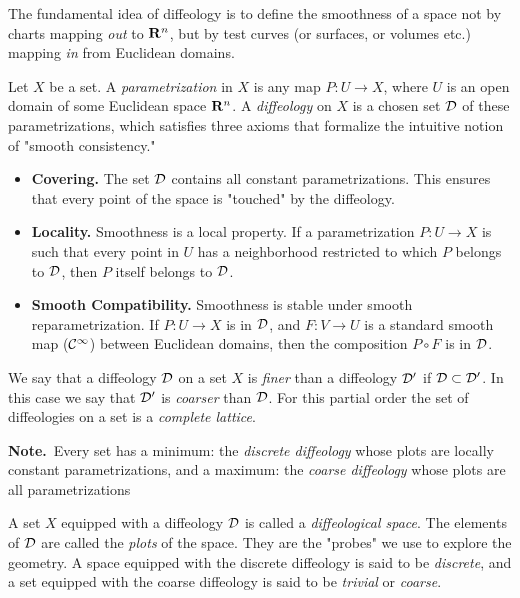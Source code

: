   The fundamental idea of diffeology is to define the smoothness of a space not by charts mapping \emph{out} to ${\mathbf{R}}^n$,
  but by test curves (or surfaces, or volumes etc.) mapping \emph{in} from Euclidean domains.
  
  Let $X$ be a set.
  A \emph{parametrization} in $X$ is any map $P: U \to X$,
  where $U$ is an open domain of some Euclidean space ${\mathbf{R}}^n$.
  A \emph{diffeology} on $X$ is a chosen set $\mathcal{D}$ of these parametrizations,
  which satisfies three axioms that formalize the intuitive notion of "smooth consistency."
  
  \begin{itemize}
    \item[D1.]\textbf{Covering.}
    The set $\mathcal{D}$ contains all constant parametrizations.
    This ensures that every point of the space is "touched" by the diffeology.
    \item[D2.] \textbf{Locality.}
    Smoothness is a local property.
    If a parametrization $P: U \to X$ is such that every point in $U$ has a neighborhood restricted to which $P$ belongs to $\mathcal{D}$,
    then $P$ itself belongs to $\mathcal{D}$.
    \item[D3.] \textbf{Smooth Compatibility.}
    Smoothness is stable under smooth re\-pa\-ra\-me\-tri\-za\-tion.
    If $P: U \to X$ is in $\mathcal{D}$,
    and $F: V \to U$ is a standard smooth map (${\mathcal{C}}^\infty$) between Euclidean domains,
    then the composition $P \circ F$ is in $\mathcal{D}$.
  \end{itemize}
  
  \begin{article}
    We say that a diffeology $\mathcal{D}$ on a set $X$ is \emph{finer} than a diffeology $\mathcal{D}'$ if $\mathcal{D} \subset \mathcal{D}'$.
    In this case we say that $\mathcal{D}'$ is \emph{coarser} than $\mathcal{D}$.
    For this partial order the set of diffeologies on a set is a \emph{complete lattice}.
    
    \textbf{Note.}~Every set has a minimum: the \emph{discrete diffeology} whose plots are locally constant parametrizations,
    and a maximum: the \emph{coarse diffeology} whose plots are all parametrizations
  \end{article}
  
  \begin{article}
    A set $X$ equipped with a diffeology $\mathcal{D}$ is called a \emph{diffeological space}.
    The elements of $\mathcal{D}$ are called the \emph{plots} of the space.
    They are the "probes" we use to explore the geometry.
    A space equipped with the discrete diffeology is said to be \emph{discrete},
    and a set equipped with the coarse diffeology is said to be \emph{trivial} or \emph{coarse}.
  \end{article}
  

